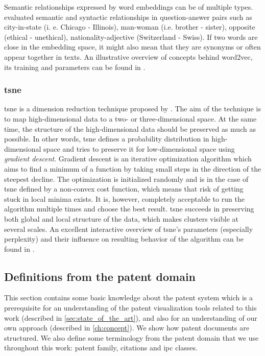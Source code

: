 Semantic relationships expressed by word embeddings can be of multiple types.
\cite{Mikolov2013} evaluated semantic and syntactic relationships in question-answer pairs such as city-in-state (i. e. Chicago - Illinois), man-woman (i.e. brother - sister), opposite (ethical - unethical), nationality-adjective (Switzerland - Swiss).
If two words are close in the embedding space, it might also mean that they are synonyms or often appear together in texts.
An illustrative overview of concepts behind word2vec, its training and parameters can be found in \cite{Alammar2019}.

\subsubsection{\gls{tsne}}
\label{subsubsec:tsne}

\gls{tsne} is a dimension reduction technique proposed by \cite{LaurensvanderMaaten2008}.
The aim of the technique is to map high-dimensional data to a two- or three-dimensional space.
At the same time, the structure of the high-dimensional data should be preserved as much as possible.
In other words, \gls{tsne} defines a probability distribution in high-dimensional space and tries to preserve it for low-dimensional space using \textit{gradient descent}.
Gradient descent is an iterative optimization algorithm which aims to find a minimum of a function by taking small steps in the direction of the steepest decline.
The optimization is initialized randomly and is in the case of \gls{tsne} defined by a non-convex cost function, which means that risk of getting stuck in local minima exists.
It is, however, completely acceptable to run the algorithm multiple times and choose the best result.
\gls{tsne} succeeds in preserving both global and local structure of the data, which makes clusters visible at several scales.
An excellent interactive overview of \gls{tsne}'s parameters (especially perplexity) and their influence on resulting behavior of the algorithm can be found in \cite{wattenberg2016how}.

\subsection{Definitions from the patent domain}
\label{subsec:definitions_from_the_patent_domain}

This section contains some basic knowledge about the patent system which is a prerequisite for an understanding of the patent visualization tools related to this work (described in \autoref{sec:state_of_the_art}), and also for an understanding of our own approach (described in \autoref{ch:concept}).
We show how patent documents are structured. 
We also define some terminology from the patent domain that we use throughout this work: patent family, citations and \gls{ipc} classes.

